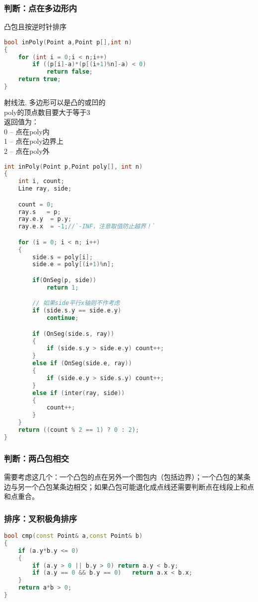 	\subsubsection{判断：点在多边形内}
		凸包且按逆时针排序
		\begin{lstlisting}[language=c++]
bool inPoly(Point a,Point p[],int n)
{
	for (int i = 0;i < n;i++)
		if ((p[i]-a)*(p[(i+1)%n]-a) < 0)
			return false;
	return true;
}
		\end{lstlisting}
		射线法, 多边形可以是凸的或凹的\\
		poly的顶点数目要大于等于3\\
		返回值为：\\
		0  -- 点在poly内\\
		1  -- 点在poly边界上\\
		2  -- 点在poly外
		\begin{lstlisting}[language=c++]
int inPoly(Point p,Point poly[], int n)
{
	int i, count;
	Line ray, side;

	count = 0;
	ray.s	= p;
	ray.e.y  = p.y;
	ray.e.x  = -1;//`-INF，注意取值防止越界！`

	for (i = 0; i < n; i++)
	{
		side.s = poly[i];
		side.e = poly[(i+1)%n];

		if(OnSeg(p, side))
			return 1;

		// 如果side平行x轴则不作考虑
		if (side.s.y == side.e.y)
			continue;

		if (OnSeg(side.s, ray))
		{
			if (side.s.y > side.e.y) count++;
		}
		else if (OnSeg(side.e, ray))
		{
			if (side.e.y > side.s.y) count++;
		}
		else if (inter(ray, side))
		{
			count++;
		}
	}
	return ((count % 2 == 1) ? 0 : 2);
}
		\end{lstlisting}
		
	\subsubsection{判断：两凸包相交}
		需要考虑这几个：一个凸包的点在另外一个图包内（包括边界）；一个凸包的某条边与另一个凸包某条边相交；如果凸包可能退化成点线还需要判断点在线段上和点和点重合。
		
	\subsubsection{排序：叉积极角排序}
	\begin{lstlisting}[language=c++]
bool cmp(const Point& a,const Point& b)
{
	if (a.y*b.y <= 0)
	{
		if (a.y > 0 || b.y > 0)	return a.y < b.y;
		if (a.y == 0 && b.y == 0)	return a.x < b.x;
	}
	return a*b > 0;
}
	\end{lstlisting}
